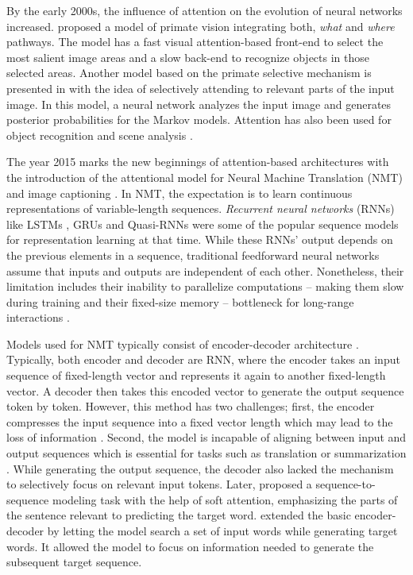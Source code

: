 By the early 2000s, the influence of attention on the evolution of neural networks increased. \citet{miau2001neural} proposed a model of primate vision integrating both, \textit{what} and \textit{where} pathways. The model has a fast visual attention-based front-end to select the most salient image areas and a slow back-end to recognize objects in those selected areas. Another model based on the primate selective mechanism is presented in \citet{salah2002selective} with the idea of selectively attending to relevant parts of the input image. In this model, a neural network analyzes the input image and generates posterior probabilities for the Markov models. Attention has also been used for object recognition \citep{walther2002attentional} and scene analysis \citep{schill2001scene}. 

The year 2015 marks the new beginnings of attention-based architectures with the introduction of the attentional model for Neural Machine Translation (NMT) \citep{Bahdanau2014-vr,luong-etal-2015-effective} and image captioning \citep{xu2015show}. In NMT, the expectation is to learn continuous representations of variable-length sequences. \textit{Recurrent neural networks} (RNNs) like LSTMs \citep{10.1162/neco.1997.9.8.1735}, GRUs \citep{cho-etal-2014-properties} and Quasi-RNNs \citep{DBLP:conf/iclr/0002MXS17} were some of the popular sequence models for representation learning at that time. While these RNNs' output depends on the previous elements in a sequence, traditional feedforward neural networks assume that inputs and outputs are independent of each other. Nonetheless, their limitation includes their inability to parallelize computations -- making them slow during training and their fixed-size memory -- bottleneck for long-range interactions \citep{vaswani2017attention}. 

Models used for NMT typically consist of encoder-decoder architecture \citep{cho-etal-2014-learning}. Typically, both encoder and decoder are RNN, where the encoder takes an input sequence of fixed-length vector and represents it again to another fixed-length vector. A decoder then takes this encoded vector to generate the output sequence token by token. However, this method has two challenges; first, the encoder compresses the input sequence into a fixed vector length which may lead to the loss of information \citep{cho-etal-2014-properties}. Second, the model is incapable of aligning between input and output sequences which is essential for tasks such as translation or summarization \citep{Young2018trends}. While generating the output sequence, the decoder also lacked the mechanism to selectively focus on relevant input tokens. Later, \citet{bahdanau2014neural} proposed a sequence-to-sequence modeling task with the help of soft attention, emphasizing the parts of the sentence relevant to predicting the target word. \citet{bahdanau2014neural} extended the basic encoder-decoder by letting the model search a set of input words while generating target words. It allowed the model to focus on information needed to generate the subsequent target sequence. 

